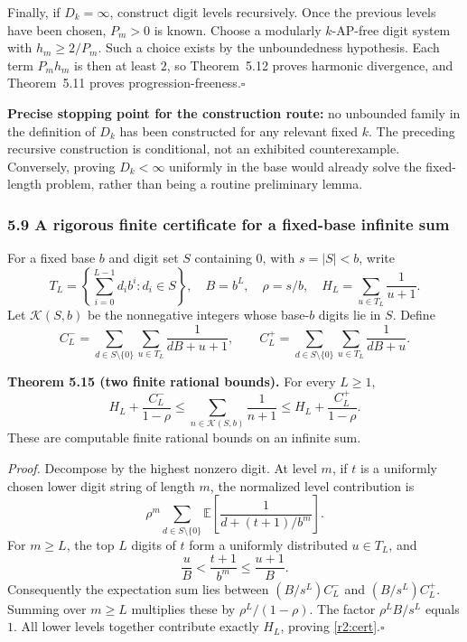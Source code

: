 Finally, if $D_k=\infty$, construct digit levels recursively. Once the previous levels have been chosen, $P_m>0$ is known. Choose a modularly $k$-AP-free digit system with $h_m\ge2/P_m$. Such a choice exists by the unboundedness hypothesis. Each term $P_mh_m$ is then at least $2$, so Theorem~5.12 proves harmonic divergence, and Theorem~5.11 proves progression-freeness.\hfill$\square$

\textbf{Precise stopping point for the construction route:} no unbounded family in the definition of $D_k$ has been constructed for any relevant fixed $k$. The preceding recursive construction is conditional, not an exhibited counterexample. Conversely, proving $D_k<\infty$ uniformly in the base would already solve the fixed-length problem, rather than being a routine preliminary lemma.

\subsubsection{5.9 A rigorous finite certificate for a fixed-base infinite sum}

For a fixed base $b$ and digit set $S$ containing $0$, with $s=|S|<b$, write
\[
T_L=\left\{\sum_{i=0}^{L-1}d_ib^i:d_i\in S\right\},\quad
B=b^L,\quad \rho=s/b,\quad
H_L=\sum_{u\in T_L}\frac1{u+1}.
\]
Let $\mathcal K(S,b)$ be the nonnegative integers whose base-$b$ digits lie in $S$. Define
\[
C_L^- =\sum_{d\in S\setminus\{0\}}\sum_{u\in T_L}\frac1{dB+u+1},
\qquad
C_L^+ =\sum_{d\in S\setminus\{0\}}\sum_{u\in T_L}\frac1{dB+u}.
\]

\noindent\textbf{Theorem 5.15 (two finite rational bounds).}
For every $L\ge1$,
\begin{equation}\label{r2:cert}
H_L+\frac{C_L^-}{1-\rho}
\le\sum_{n\in\mathcal K(S,b)}\frac1{n+1}
\le H_L+\frac{C_L^+}{1-\rho}.
\end{equation}
These are computable finite rational bounds on an infinite sum.

\noindent\emph{Proof.}
Decompose by the highest nonzero digit. At level $m$, if $t$ is a uniformly chosen lower digit string of length $m$, the normalized level contribution is
\[
\rho^m\sum_{d\in S\setminus\{0\}}
\mathbb E\left[\frac1{d+(t+1)/b^m}\right].
\]
For $m\ge L$, the top $L$ digits of $t$ form a uniformly distributed $u\in T_L$, and
\[
\frac{u}{B}<\frac{t+1}{b^m}\le\frac{u+1}{B}.
\]
Consequently the expectation sum lies between $(B/s^L)C_L^-$ and $(B/s^L)C_L^+$. Summing over $m\ge L$ multiplies these by $\rho^L/(1-\rho)$. The factor $\rho^L B/s^L$ equals $1$. All lower levels together contribute exactly $H_L$, proving \eqref{r2:cert}.\hfill$\square$

